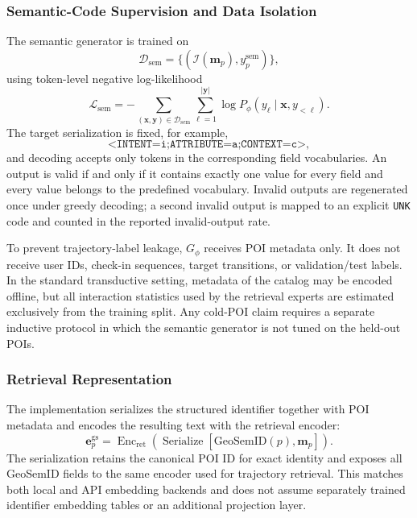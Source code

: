 \documentclass[journal]{IEEEtran}
\newcommand{\gsid}{\mathrm{GeoSemID}}
\begin{document}
\subsubsection{Semantic-Code Supervision and Data Isolation}

The semantic generator is trained on
\begin{equation}
\mathcal{D}_{\mathrm{sem}}
=
\{
(\mathcal{I}(\bm{m}_p),y_p^{\mathrm{sem}})
\},
\label{eq:semantic_dataset}
\end{equation}
using token-level negative log-likelihood
\begin{equation}
\mathcal{L}_{\mathrm{sem}}
=
-
\sum_{(\bm{x},\bm{y})\in\mathcal{D}_{\mathrm{sem}}}
\sum_{\ell=1}^{|\bm{y}|}
\log P_{\phi}(y_{\ell}\mid\bm{x},y_{<\ell}).
\label{eq:semantic_loss}
\end{equation}
The target serialization is fixed, for example,
\begin{equation}
\texttt{<INTENT=i;ATTRIBUTE=a;CONTEXT=c>},
\label{eq:serialization_example}
\end{equation}
and decoding accepts only tokens in the corresponding field vocabularies.
An output is valid if and only if it contains exactly one value for every
field and every value belongs to the predefined vocabulary.
Invalid outputs are regenerated once under greedy decoding; a second invalid
output is mapped to an explicit \texttt{UNK} code and counted in the reported
invalid-output rate.

To prevent trajectory-label leakage, $G_{\phi}$ receives POI metadata only.
It does not receive user IDs, check-in sequences, target transitions, or
validation/test labels.
In the standard transductive setting, metadata of the catalog may be encoded
offline, but all interaction statistics used by the retrieval experts are
estimated exclusively from the training split.
Any cold-POI claim requires a separate inductive protocol in which the
semantic generator is not tuned on the held-out POIs.

\subsubsection{Retrieval Representation}

The implementation serializes the structured identifier together with POI
metadata and encodes the resulting text with the retrieval encoder:
\begin{equation}
\bm{e}_{p}^{\mathrm{gs}}
=
\operatorname{Enc}_{\mathrm{ret}}
\left(
\operatorname{Serialize}
\left[
\gsid(p),\bm{m}_p
\right]
\right).
\label{eq:geosemid_embedding}
\end{equation}
The serialization retains the canonical POI ID for exact identity and exposes
all GeoSemID fields to the same encoder used for trajectory retrieval. This
matches both local and API embedding backends and does not assume separately
trained identifier embedding tables or an additional projection layer.
\end{document}

